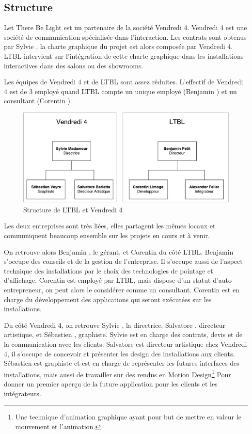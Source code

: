 \documentclass{article}
\begin{document}
\subsection{Structure}

Let There Be Light est un partenaire de la société Vendredi 4.
Vendredi 4 est une société de communication spécialisée dans l'interaction.
Les contrats sont obtenus par Sylvie , la charte graphique du projet est alors composée par Vendredi 4.
LTBL intervient sur l'intégration de cette charte graphique dans les installations interactives dans des salons ou des showrooms.

Les équipes de Vendredi 4 et de LTBL sont assez réduites.
L'effectif de Vendredi 4 est de 3 employé quand LTBL compte un unique employé (Benjamin ) et un consultant (Corentin )

\begin{figure}[h]
    \centering
    \includegraphics[scale=0.7]{Structure-LTBL.pdf}
    \caption{Structure de LTBL et Vendredi 4}
\end{figure}

Les deux entreprises sont très liées, elles partagent les mêmes locaux et communiquent beaucoup ensemble sur les projets en cours et à venir.

On retrouve alors Benjamin , le gérant, et Corentin  du côté LTBL.
Benjamin s'occupe des conseils et de la gestion de l'entreprise.
Il s'occupe aussi de l'aspect technique des installations par le choix des technologies de pointage et d'affichage.
Corentin est employé par LTBL, mais dispose d'un statut d'auto-entrepreneur, on peut alors le considérer comme un consultant.
Corentin est en charge du développement des applications qui seront exécutées sur les installations.

Du côté Vendredi 4, on retrouve Sylvie , la directrice, Salvatore , directeur artistique, et Sébastien , graphiste.
Sylvie est en charge des contrats, devis et de la communication avec les clients.
Salvatore est directeur artistique chez Vendredi 4, il s'occupe de concevoir et présenter les design des installations aux clients.
Sébastien est graphiste et est en charge de représenter les futures interfaces des installations, mais aussi de travailler sur des rendus en Motion Design\footnote{Une technique d'animation graphique ayant pour but de mettre en valeur le mouvement et l'animation.} Pour donner un premier aperçu de la future application pour les clients et les intégrateurs.
\end{document}

